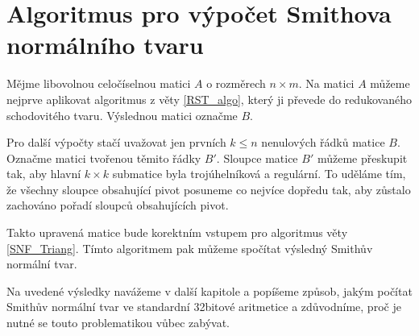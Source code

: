 \section{Algoritmus pro výpočet Smithova normálního tvaru}
Mějme libovolnou celočíselnou matici $ A $ o rozměrech $ n \times m $. Na matici
$ A $ můžeme nejprve aplikovat algoritmus z věty \ref{RST_algo}, který ji
převede do redukovaného schodovitého tvaru. Výslednou matici označme $ B $.

Pro další výpočty stačí uvažovat jen prvních $ k \leq n $ nenulových řádků
matice $ B $. Označme matici tvořenou těmito řádky $ B' $. Sloupce
matice $ B' $ můžeme přeskupit tak, aby hlavní $ k \times k $
submatice byla trojúhelníková a regulární. To uděláme tím, že všechny sloupce
obsahující pivot posuneme co nejvíce dopředu tak, aby zůstalo zachováno pořadí
sloupců obsahujících pivot.

Takto upravená matice bude korektním vstupem pro algoritmus věty
\ref{SNF_Triang}. Tímto algoritmem pak můžeme spočítat výsledný Smithův normální
tvar.

Na uvedené výsledky navážeme v další kapitole a popíšeme způsob, jakým počítat
Smithův normální tvar ve standardní 32bitové aritmetice a zdůvodníme, proč 
je nutné se touto problematikou vůbec zabývat.
